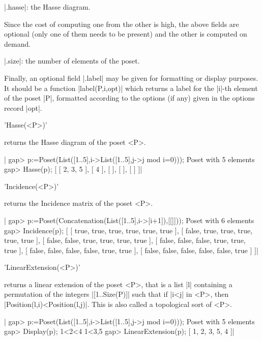   |.hasse|: the Hasse diagram.

Since the cost of computing one from the other is high, the above fields are
optional (only one of them needs to be present) and the other is computed on
demand.

  |.size|: the number of elements of the poset.

Finally,  an optional field |.label| may be given for formatting or display
purposes.  It should be  a function |label(P,i,opt)|  which returns a label
for the |i|-th element of the poset |P|, formatted according to the options
(if any) given in the options record |opt|.

%

'Hasse(<P>)'

returns the Hasse diagram of the poset <P>.

|    gap> p:=Poset(List([1..5],i->List([1..5],j->j mod i=0)));
    Poset with 5 elements
    gap> Hasse(p);
    [ [ 2, 3, 5 ], [ 4 ], [  ], [  ], [  ] ]|

%

'Incidence(<P>)'

returns the Incidence matrix of the poset <P>.

|    gap> p:=Poset(Concatenation(List([1..5],i->[i+1]),[[]]));
    Poset with 6 elements
    gap> Incidence(p);
    [ [ true, true, true, true, true, true ],
      [ false, true, true, true, true, true ],
      [ false, false, true, true, true, true ],
      [ false, false, false, true, true, true ],
      [ false, false, false, false, true, true ],
      [ false, false, false, false, false, true ] ]|

%

'LinearExtension(<P>)'

returns  a linear extension of the poset <P>, that is a list |l| containing
a  permutation of  the integers  |[1..Size(P)]| such  that if |i<j| in <P>,
then |Position(l,i)<Position(l,j)|. This is also called a topological sort
of <P>.

|    gap> p:=Poset(List([1..5],i->List([1..5],j->j mod i=0)));
    Poset with 5 elements
    gap> Display(p);
    1<2<4
    1<3,5
    gap> LinearExtension(p);
    [ 1, 2, 3, 5, 4 ]|

